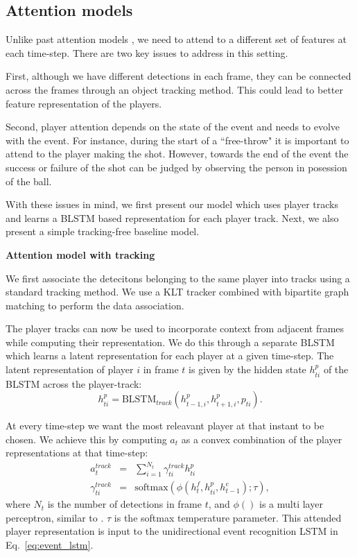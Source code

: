 \subsection{Attention models}
Unlike past attention models \cite{}, we need to attend to a different set of
features at each time-step. There are two key issues to address in this
setting.

First, although we have different detections in each frame, they
can be connected across the frames through an object tracking
method. This could lead to better feature representation of the
players.

Second, player attention depends on the state of the event and needs to evolve
with the event.  For instance, during the start of a ``free-throw" it is
important to attend to the player making the shot. However, towards the end of
the event the success or failure of the shot can be judged by observing the
person in posession of the ball.

With these issues in mind, we first present our model which uses player tracks
and learns a BLSTM based representation for each player track. Next, we also
present a simple tracking-free baseline model.

\noindent \textbf{Attention model with tracking}

We first associate the detecitons
belonging to the same player into tracks using a standard
tracking method. We use a KLT tracker combined with
bipartite graph matching \cite{} to perform the data association.

The player tracks can now be used to incorporate context
from adjacent frames while computing their representation.
We do this through a separate BLSTM which learns a latent
representation for each player at a given time-step.
The latent representation of player $i$ in frame $t$ is
given by the hidden state
$h_{ti}^p$ of the BLSTM across the player-track:
\[
  h_{ti}^p = \mbox{BLSTM}_{track}(h_{t-1,i}^p, h_{t+1,i}^p, p_{ti}).
\]

At every time-step we want the most releavant player at that
instant to be chosen. We achieve this by computing
$a_t$ as a convex combination of the player representations
at that time-step:
\begin{eqnarray} 
\label{eq:track}
  a_t^{track} & = & \sum_{i=1}^{N_t} \gamma_{ti}^{track} h_{ti}^p \\ \nonumber
  \gamma_{ti}^{track} & = & \text{softmax} \left(\phi\left(h^f_t, h^p_{ti}, h^e_{t-1}\right); \tau\right),
\end{eqnarray}where $N_t$ is the number of detections in frame $t$, and $\phi()$ is a 
multi layer perceptron, similar to \cite{Bahdnau_arxiv14}. $\tau$ is the softmax temperature parameter.
This attended player representation is input to the
unidirectional event recognition LSTM in Eq.~\ref{eq:event_lstm}.

